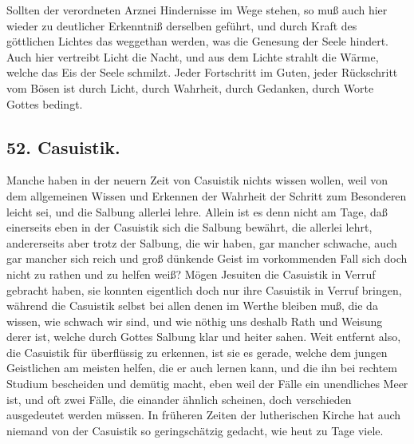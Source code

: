 Sollten der verordneten Arznei Hindernisse im Wege stehen, so muß auch hier wieder zu deutlicher Erkenntniß derselben geführt, und durch Kraft des göttlichen Lichtes das weggethan werden, was die Genesung der Seele hindert. Auch hier vertreibt Licht die Nacht, und aus dem Lichte strahlt die Wärme, welche das Eis der Seele schmilzt. Jeder Fortschritt im Guten, jeder Rückschritt vom Bösen ist durch Licht, durch Wahrheit, durch Gedanken, durch Worte Gottes bedingt.

\subsection*{52. Casuistik.}

Manche haben in der neuern Zeit von Casuistik nichts wissen wollen, weil von dem allgemeinen Wissen und Erkennen der Wahrheit der Schritt zum Besonderen leicht sei, und die Salbung allerlei lehre. Allein ist es denn nicht am Tage, daß einerseits eben in der Casuistik sich die Salbung bewährt, die allerlei lehrt, andererseits aber trotz der Salbung, die wir haben, gar mancher schwache, auch gar mancher sich reich und groß dünkende Geist im vorkommenden Fall sich doch nicht zu rathen und zu helfen weiß? Mögen Jesuiten die Casuistik in Verruf gebracht haben, sie konnten eigentlich doch nur ihre Casuistik in Verruf bringen, während die Casuistik selbst bei allen denen im Werthe bleiben muß, die da wissen, wie schwach wir sind, und wie nöthig uns deshalb Rath und Weisung derer ist, welche durch Gottes Salbung klar und heiter sahen. Weit entfernt also, die Casuistik für überflüssig zu erkennen, ist sie es gerade, welche dem jungen Geistlichen am meisten helfen, die er auch lernen kann, und
die ihn bei rechtem Studium bescheiden und demütig macht, eben weil der Fälle ein unendliches Meer ist, und oft zwei Fälle, die einander ähnlich scheinen, doch verschieden ausgedeutet werden müssen. In früheren Zeiten der lutherischen Kirche hat auch niemand von der Casuistik so geringschätzig gedacht, wie heut zu Tage viele.

